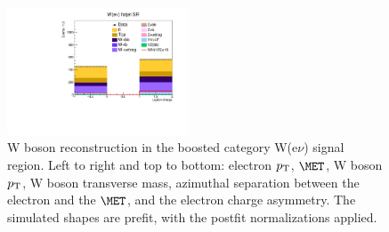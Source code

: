 \begin{figure}[tbp]
\begin{center}
    \includegraphics[width=0.48\textwidth]{figures/wlnhbb2016/boosted/WenWHFJSR_lepton1Charge.pdf}
    \caption{W boson reconstruction in the boosted category W(e$\nu$) signal region.
    Left to right and top to bottom: electron $p_{\mathrm{T}}$, $\MET$, W boson $p_{\mathrm{T}}$, W boson transverse mass,
    azimuthal separation between the electron and the $\MET$, and the electron charge asymmetry.
    The simulated shapes are prefit, with the postfit normalizations applied.}
    \label{fig:boost_WenSR_WBosons}
  \end{center}
\end{figure}
\clearpage


